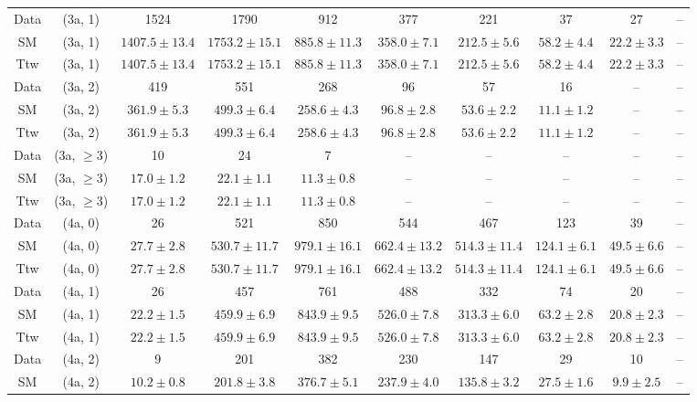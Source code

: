 \begin{table}[h!]
{\begin{tabular}{cccccccccc}
	Data & (3a, 1) & 1524 & 1790 & 912 & 377 & 221 & 37 & 27 & -- \\[0.5ex] 
	SM & (3a, 1) & $1407.5\pm 13.4$ & $1753.2\pm 15.1$ & $885.8\pm 11.3$ & $358.0\pm 7.1$ & $212.5\pm 5.6$ & $58.2\pm 4.4$ & $22.2\pm 3.3$ & -- \\[0.5ex] 
	Ttw & (3a, 1) & $1407.5\pm 13.4$ & $1753.2\pm 15.1$ & $885.8\pm 11.3$ & $358.0\pm 7.1$ & $212.5\pm 5.6$ & $58.2\pm 4.4$ & $22.2\pm 3.3$ & -- \\[0.5ex] 
	Data & (3a, 2) & 419 & 551 & 268 & 96 & 57 & 16 & -- & -- \\[0.5ex] 
	SM & (3a, 2) & $361.9\pm 5.3$ & $499.3\pm 6.4$ & $258.6\pm 4.3$ & $96.8\pm 2.8$ & $53.6\pm 2.2$ & $11.1\pm 1.2$ & -- & -- \\[0.5ex] 
	Ttw & (3a, 2) & $361.9\pm 5.3$ & $499.3\pm 6.4$ & $258.6\pm 4.3$ & $96.8\pm 2.8$ & $53.6\pm 2.2$ & $11.1\pm 1.2$ & -- & -- \\[0.5ex] 
	Data & (3a, $\ge3$) & 10 & 24 & 7 & -- & -- & -- & -- & -- \\[0.5ex] 
	SM & (3a, $\ge3$) & $17.0\pm 1.2$ & $22.1\pm 1.1$ & $11.3\pm 0.8$ & -- & -- & -- & -- & -- \\[0.5ex] 
	Ttw & (3a, $\ge3$) & $17.0\pm 1.2$ & $22.1\pm 1.1$ & $11.3\pm 0.8$ & -- & -- & -- & -- & -- \\[0.5ex] 
	Data & (4a, 0) & 26 & 521 & 850 & 544 & 467 & 123 & 39 & -- \\[0.5ex] 
	SM & (4a, 0) & $27.7\pm 2.8$ & $530.7\pm 11.7$ & $979.1\pm 16.1$ & $662.4\pm 13.2$ & $514.3\pm 11.4$ & $124.1\pm 6.1$ & $49.5\pm 6.6$ & -- \\[0.5ex] 
	Ttw & (4a, 0) & $27.7\pm 2.8$ & $530.7\pm 11.7$ & $979.1\pm 16.1$ & $662.4\pm 13.2$ & $514.3\pm 11.4$ & $124.1\pm 6.1$ & $49.5\pm 6.6$ & -- \\[0.5ex] 
	Data & (4a, 1) & 26 & 457 & 761 & 488 & 332 & 74 & 20 & -- \\[0.5ex] 
	SM & (4a, 1) & $22.2\pm 1.5$ & $459.9\pm 6.9$ & $843.9\pm 9.5$ & $526.0\pm 7.8$ & $313.3\pm 6.0$ & $63.2\pm 2.8$ & $20.8\pm 2.3$ & -- \\[0.5ex] 
	Ttw & (4a, 1) & $22.2\pm 1.5$ & $459.9\pm 6.9$ & $843.9\pm 9.5$ & $526.0\pm 7.8$ & $313.3\pm 6.0$ & $63.2\pm 2.8$ & $20.8\pm 2.3$ & -- \\[0.5ex] 
	Data & (4a, 2) & 9 & 201 & 382 & 230 & 147 & 29 & 10 & -- \\[0.5ex] 
	SM & (4a, 2) & $10.2\pm 0.8$ & $201.8\pm 3.8$ & $376.7\pm 5.1$ & $237.9\pm 4.0$ & $135.8\pm 3.2$ & $27.5\pm 1.6$ & $9.9\pm 2.5$ & -- \\[0.5ex] 

\end{tabular}}
\end{table}
